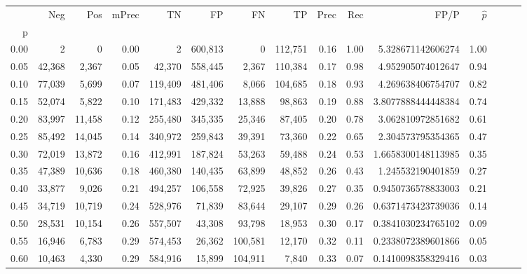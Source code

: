 \begin{tabular}{rrrrrrrrrrrrrrr}
\toprule
{} &     Neg &     Pos & mPrec &       TN &       FP &       FN &       TP &  Prec &   Rec &                   FP/P & $\hat{p}$ \\
p    &         &         &       &          &          &          &          &       &       &                        &           \\
\midrule
0.00 &       2 &       0 &  0.00 &        2 &  600,813 &        0 &  112,751 &  0.16 &  1.00 &      5.328671142606274 &      1.00 \\
0.05 &  42,368 &   2,367 &  0.05 &   42,370 &  558,445 &    2,367 &  110,384 &  0.17 &  0.98 &      4.952905074012647 &      0.94 \\
0.10 &  77,039 &   5,699 &  0.07 &  119,409 &  481,406 &    8,066 &  104,685 &  0.18 &  0.93 &      4.269638406754707 &      0.82 \\
0.15 &  52,074 &   5,822 &  0.10 &  171,483 &  429,332 &   13,888 &   98,863 &  0.19 &  0.88 &     3.8077888444448384 &      0.74 \\
0.20 &  83,997 &  11,458 &  0.12 &  255,480 &  345,335 &   25,346 &   87,405 &  0.20 &  0.78 &      3.062810972851682 &      0.61 \\
0.25 &  85,492 &  14,045 &  0.14 &  340,972 &  259,843 &   39,391 &   73,360 &  0.22 &  0.65 &      2.304573795354365 &      0.47 \\
0.30 &  72,019 &  13,872 &  0.16 &  412,991 &  187,824 &   53,263 &   59,488 &  0.24 &  0.53 &     1.6658300148113985 &      0.35 \\
0.35 &  47,389 &  10,636 &  0.18 &  460,380 &  140,435 &   63,899 &   48,852 &  0.26 &  0.43 &      1.245532190401859 &      0.27 \\
0.40 &  33,877 &   9,026 &  0.21 &  494,257 &  106,558 &   72,925 &   39,826 &  0.27 &  0.35 &     0.9450736578833003 &      0.21 \\
0.45 &  34,719 &  10,719 &  0.24 &  528,976 &   71,839 &   83,644 &   29,107 &  0.29 &  0.26 &     0.6371473423739036 &      0.14 \\
0.50 &  28,531 &  10,154 &  0.26 &  557,507 &   43,308 &   93,798 &   18,953 &  0.30 &  0.17 &     0.3841030234765102 &      0.09 \\
0.55 &  16,946 &   6,783 &  0.29 &  574,453 &   26,362 &  100,581 &   12,170 &  0.32 &  0.11 &     0.2338072389601866 &      0.05 \\
0.60 &  10,463 &   4,330 &  0.29 &  584,916 &   15,899 &  104,911 &    7,840 &  0.33 &  0.07 &     0.1410098358329416 &      0.03 \\

\end{tabular}

